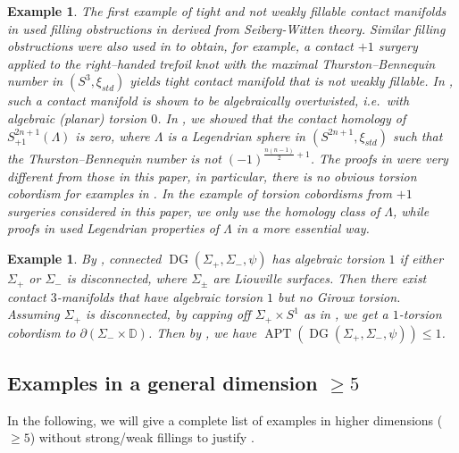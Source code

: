 \documentclass[11pt]{amsart}
\numberwithin{equation}{section}
\newtheorem{example}[theorem]{\textbf{Example}}
\def\D{{\mathbb D}}
\DeclareMathOperator{\APT}{APT}
\DeclareMathOperator{\DG}{DG}
\begin{document}
\begin{example}
    The first example of tight and not weakly fillable contact manifolds in \cite{EtnHon} used filling obstructions in \cite{Lisca} derived from Seiberg-Witten theory. Similar filling obstructions were also used in \cite{zbMATH02105207} to obtain, for example, a contact $+1$ surgery applied to the right–handed trefoil knot with the maximal Thurston–Bennequin number in $(S^3,\xi_{std})$ yields tight contact manifold that is not weakly fillable. In \cite{zbMATH07699409}, such a contact manifold is shown to be algebraically overtwisted, i.e.\ with algebraic (planar) torsion $0$. In \cite{AOT}, we showed that the contact homology of $S^{2n+1}_{+1}(\Lambda)$ is zero, where $\Lambda$ is a Legendrian sphere in $(S^{2n+1},\xi_{std})$ such that the Thurston–Bennequin number is not $(-1)^{\frac{n(n-1)}{2}+1}$. The proofs in \cite{AOT} were very different from those in this paper, in particular, there is no obvious torsion cobordism for examples in \cite{AOT}. In the example of torsion cobordisms from $+1$ surgeries considered in this paper, we only use the homology class of $\Lambda$, while proofs in \cite{AOT} used Legendrian properties of $\Lambda$ in a more essential way.  
\end{example}

\begin{example}
    By \cite[Theorem 3]{LW}, connected $\DG(\Sigma_+,\Sigma_-,\psi)$ has algebraic torsion $1$ if either $\Sigma_+$ or $\Sigma_-$ is disconnected, where $\Sigma_{\pm}$ are Liouville surfaces. Then there exist contact $3$-manifolds that have algebraic torsion $1$ but no Giroux torsion.  Assuming $\Sigma_+$ is disconnected, by capping off $\Sigma_+\times S^1$ as in , we get a $1$-torsion cobordism to $\partial(\Sigma_-\times \D)$. Then by , we have $\APT(\DG(\Sigma_+,\Sigma_-,\psi))\le 1$.
\end{example}



\subsection{Examples in a general dimension $\ge 5$}\label{ss:dim5}
In the following, we will give a complete list of examples in higher dimensions ($\ge 5$) without strong/weak fillings to justify .
\end{document}
